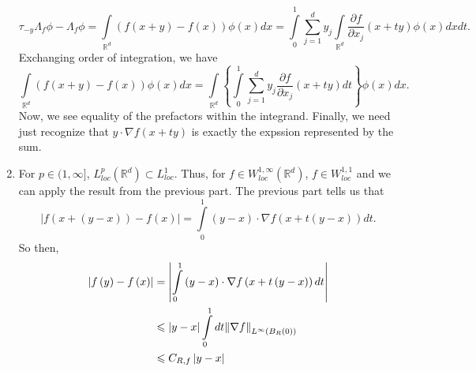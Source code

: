 \documentclass[letterpaper,twoside,11pt]{article}
\theoremstyle{mystyle}
\newcommand{\R}{{\mathbb R}}
\begin{document}
\begin{enumerate}
    \[{\tau _{ - y}}{\Lambda _f}\phi  - {\Lambda _f}\phi  = \int\limits_{{\mathbb{R}^d}} {\left( {f\left( {x + y} \right) - f\left( x \right)} \right)\phi \left( x \right)dx}  = \int\limits_0^1 {\sum\limits_{j = 1}^d {{y_j}\int\limits_{{\mathbb{R}^d}} {\frac{{\partial f}}{{\partial {x_j}}}\left( {x + ty} \right)\phi \left( x \right)dx} } dt} .\]
    Exchanging order of integration, we have 
    \[\int\limits_{{\mathbb{R}^d}} {\left( {f\left( {x + y} \right) - f\left( x \right)} \right)\phi \left( x \right)dx}  = \int\limits_{{\mathbb{R}^d}} {\left\{ {\int\limits_0^1 {\sum\limits_{j = 1}^d {{y_j}\frac{{\partial f}}{{\partial {x_j}}}\left( {x + ty} \right)dt} } } \right\}\phi \left( x \right)dx} .\] 
    Now, we see equality of the prefactors within the integrand. Finally, we need just recognize that $y \cdot \nabla f \left( x+ty \right)$ is exactly the expssion represented by the sum. 
    \item For $p \in (1,\infty]$, $L_{loc}^p\left( \R^d \right)\subset L_{loc}^1$. Thus, for $f\in W^{1, \infty}_{loc}\left( \R^d \right)$, $f \in W^{1,1}_{loc}$ and we can apply the result from the previous part. The previous part tells us that 
    \[\left| {f\left( {x + \left( {y - x} \right)} \right) - f\left( x \right)} \right| = \int\limits_0^1 {\left( {y - x} \right) \cdot \nabla f\left( {x + t\left( {y - x} \right)} \right)dt} .\]
    So then, 
    \begin{align*}
      \left| {f\left( y \right) - f\left( x \right)} \right| &= \left| {\int\limits_0^1 {\left( {y - x} \right) \cdot \nabla f\left( {x + t\left( {y - x} \right)} \right)dt} } \right| \hfill \\
       &\leqslant \left| {y - x} \right|\int\limits_0^1 {dt} {\left\| {\nabla f} \right\|_{{L^\infty }\left( {{B_R}\left( 0 \right)} \right)}} \hfill \\
       &\leqslant {C_{R,f}}\left| {y - x} \right| 
      \end{align*}
\end{enumerate}
\end{document}
